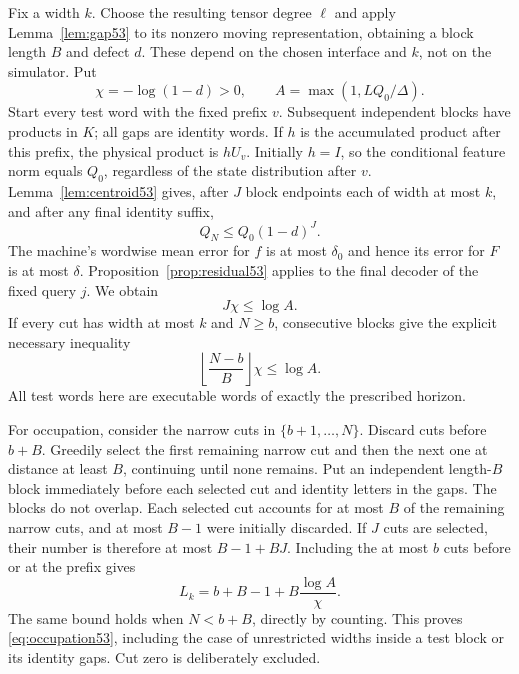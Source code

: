 \documentclass[11pt]{amsart}
\numberwithin{equation}{section}
\theoremstyle{definition}
\theoremstyle{remark}
\begin{document}
Fix a width $k$. Choose the resulting tensor degree $\ell$ and apply Lemma~\ref{lem:gap53} to its nonzero moving representation, obtaining a block length $B$ and defect $d$. These depend on the chosen interface and $k$, not on the simulator. Put
\begin{equation}\label{eq:constants53}
 \chi=-\log(1-d)>0,\qquad
 A=\max(1,LQ_0/\Delta).
\end{equation}
Start every test word with the fixed prefix $v$. Subsequent independent blocks have products in $K$; all gaps are identity words. If $h$ is the accumulated product after this prefix, the physical product is $hU_v$. Initially $h=I$, so the conditional feature norm equals $Q_0$, regardless of the state distribution after $v$. Lemma~\ref{lem:centroid53} gives, after $J$ block endpoints each of width at most $k$, and after any final identity suffix,
\[
 Q_N\le Q_0(1-d)^J.
\]
The machine's wordwise mean error for $f$ is at most $\delta_0$ and hence its error for $F$ is at most $\delta$. Proposition~\ref{prop:residual53} applies to the final decoder of the fixed query $j$. We obtain
\begin{equation}\label{eq:J53}
                         J\chi\le\log A.
\end{equation}
If every cut has width at most $k$ and $N\ge b$, consecutive blocks give the explicit necessary inequality
\begin{equation}\label{eq:peak53}
              \left\lfloor\frac{N-b}{B}\right\rfloor\chi\le\log A.
\end{equation}
All test words here are executable words of exactly the prescribed horizon.

For occupation, consider the narrow cuts in $\{b+1,\ldots,N\}$. Discard cuts before $b+B$. Greedily select the first remaining narrow cut and then the next one at distance at least $B$, continuing until none remains. Put an independent length-$B$ block immediately before each selected cut and identity letters in the gaps. The blocks do not overlap. Each selected cut accounts for at most $B$ of the remaining narrow cuts, and at most $B-1$ were initially discarded. If $J$ cuts are selected, their number is therefore at most $B-1+BJ$. Including the at most $b$ cuts before or at the prefix gives
\begin{equation}\label{eq:Lk53}
 L_k=b+B-1+B\frac{\log A}{\chi}.
\end{equation}
The same bound holds when $N<b+B$, directly by counting. This proves \eqref{eq:occupation53}, including the case of unrestricted widths inside a test block or its identity gaps. Cut zero is deliberately excluded.
\end{document}
